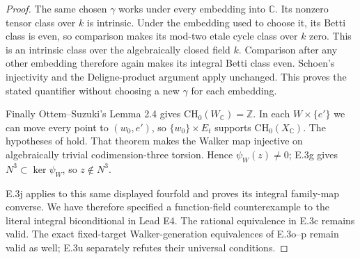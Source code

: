 \begin{proof}
The same chosen $\gamma$ works under every embedding into
$\mathbb C$. Its nonzero tensor class over $k$ is intrinsic.
Under the embedding used to choose it, its Betti class is even,
so comparison makes its mod-two etale cycle class over $k$ zero.
This is an intrinsic class over the algebraically closed field
$k$. Comparison after any other embedding therefore again makes
its integral Betti class even. Schoen's injectivity and the
Deligne-product argument apply unchanged. This proves the
stated quantifier without choosing a new $\gamma$ for each
embedding.

Finally Ottem--Suzuki's Lemma 2.4 gives
$\mathrm{CH}_0(W_{\mathbb C})=\mathbb Z$. In each
$W\times\{e'\}$ we can move every point to $(w_0,e')$, so
$\{w_0\}\times E_t$ supports $\mathrm{CH}_0(X_{\mathbb C})$.
The hypotheses of
\citet[Theorem 1.1, author p.~2]{cySuzuki2020Remark} hold.
That theorem makes the Walker map injective on algebraically
trivial codimension-three torsion. Hence $\psi_W(z)\ne0$;
E.3g gives $N^3\subset\ker\psi_W$, so $z\notin N^3$.

E.3j applies to this same displayed fourfold and proves its
integral family-map converse. We have therefore specified a
function-field counterexample to the literal integral
biconditional in Lead E4. The rational equivalence in E.3c
remains valid. The exact fixed-target Walker-generation
equivalences of E.3o--p remain valid as well; E.3u separately
refutes their universal conditions.
\end{proof}

